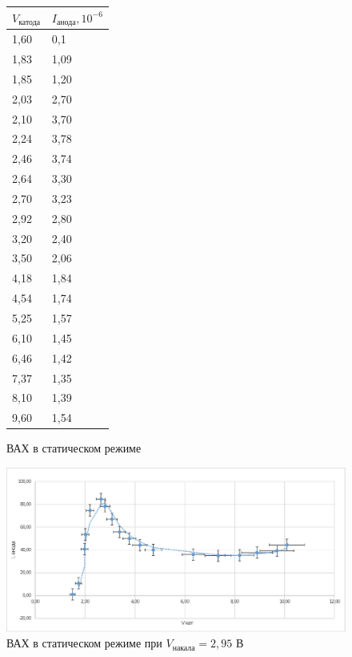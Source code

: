 \documentclass[a4paper,12pt]{article}
\theoremstyle{plain} %
\theoremstyle{definition} %
\theoremstyle{remark} %
\begin{document}
\begin{figure}[h]
\begin{floatrow}
\begin{tabular}{|l|l|}
\hline
\rowcolor[HTML]{FFECCB} 
\textbf{$V_\text{катода}$}  & \textbf{$I_\text{анода}, 10^{-6}$} \\ \hline
1,60  & 0,1 \\ \hline
1,83 & 1,09 \\ \hline
1,85 & 1,20 \\ \hline
2,03 & 2,70 \\ \hline
2,10  & 3,70 \\ \hline
2,24 & 3,78 \\ \hline
2,46 & 3,74 \\ \hline
2,64 & 3,30 \\ \hline
2,70  & 3,23 \\ \hline
2,92 & 2,80 \\ \hline
3,20  & 2,40 \\ \hline
3,50  & 2,06 \\ \hline
4,18 & 1,84 \\ \hline
4,54 & 1,74 \\ \hline
5,25 & 1,57 \\ \hline
6,10  & 1,45 \\ \hline
6,46 & 1,42 \\ \hline
7,37 & 1,35 \\ \hline
8,10  & 1,39 \\ \hline
9,60  & 1,54 \\ \hline
\end{tabular}

\caption{ВАХ в статическом режиме}
\end{floatrow}

\end{figure}

\begin{figure}[h]
    \begin{center}
        \includegraphics[width=1 \textwidth]{graph1.eps}
    \end{center}
    \caption{ВАХ в статическом режиме при $V_\text{накала} = 2,95 \text{ В}$}
\end{figure}
\end{document}
